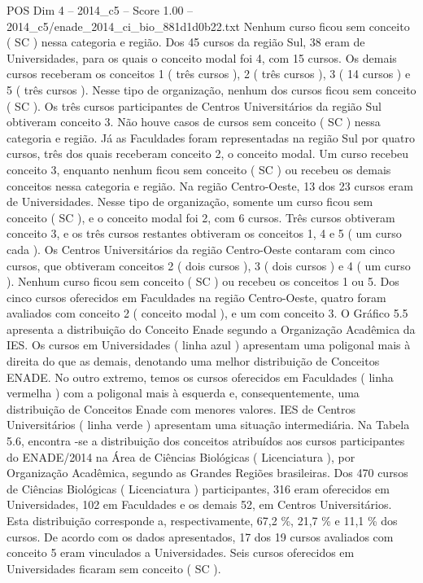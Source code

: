 \begin{textsample}{POS Dim 4 – 2014\_c5 – Score 1.00 – 2014\_c5/enade\_2014\_ci\_bio\_881d1d0b22.txt}
Nenhum curso ficou sem conceito ( SC ) nessa categoria e região.
Dos 45 cursos da região Sul, 38 eram de Universidades, para os quais o conceito modal foi 4, com 15 cursos.
Os demais cursos receberam os conceitos 1 ( três cursos ), 2 ( três cursos ), 3 ( 14 cursos ) e 5 ( três cursos ).
Nesse tipo de organização, nenhum dos cursos ficou sem conceito ( SC ).
Os três cursos participantes de Centros Universitários da região Sul obtiveram conceito 3.
Não houve casos de cursos sem conceito ( SC ) nessa categoria e região.
Já as Faculdades foram representadas na região Sul por quatro cursos, três dos quais receberam conceito 2, o conceito modal.
Um curso recebeu conceito 3, enquanto nenhum ficou sem conceito ( SC ) ou recebeu os demais conceitos nessa categoria e região.
Na região Centro-Oeste, 13 dos 23 cursos eram de Universidades.
Nesse tipo de organização, somente um curso ficou sem conceito ( SC ), e o conceito modal foi 2, com 6 cursos.
Três cursos obtiveram conceito 3, e os três cursos restantes obtiveram os conceitos 1, 4 e 5 ( um curso cada ).
Os Centros Universitários da região Centro-Oeste contaram com cinco cursos, que obtiveram conceitos 2 ( dois cursos ), 3 ( dois cursos ) e 4 ( um curso ).
Nenhum curso ficou sem conceito ( SC ) ou recebeu os conceitos 1 ou 5.
Dos cinco cursos oferecidos em Faculdades na região Centro-Oeste, quatro foram avaliados com conceito 2 ( conceito modal ), e um com conceito 3.
O Gráfico 5.5 apresenta a distribuição do Conceito Enade segundo a Organização Acadêmica da IES.
Os cursos em Universidades ( linha azul ) apresentam uma poligonal mais à direita do que as demais, denotando uma melhor distribuição de Conceitos ENADE.
No outro extremo, temos os cursos oferecidos em Faculdades ( linha vermelha ) com a poligonal mais à esquerda e, consequentemente, uma distribuição de Conceitos Enade com menores valores.
IES de Centros Universitários ( linha verde ) apresentam uma situação intermediária.
Na Tabela 5.6, encontra -se a distribuição dos conceitos atribuídos aos cursos participantes do ENADE/2014 na Área de Ciências Biológicas ( Licenciatura ), por Organização Acadêmica, segundo as Grandes Regiões brasileiras.
Dos 470 cursos de Ciências Biológicas ( Licenciatura ) participantes, 316 eram oferecidos em Universidades, 102 em Faculdades e os demais 52, em Centros Universitários.
Esta distribuição corresponde a, respectivamente, 67,2 \%, 21,7 \% e 11,1 \% dos cursos.
De acordo com os dados apresentados, 17 dos 19 cursos avaliados com conceito 5 eram vinculados a Universidades.
Seis cursos oferecidos em Universidades ficaram sem conceito ( SC ).

\end{textsample}
